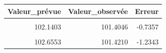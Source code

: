 \centering
\centering
\begin{tabular}[t]{rrr}
\toprule
Valeur\_prévue & Valeur\_observée & Erreur\\
\midrule
\cellcolor{gray!10}{102.1631} & \cellcolor{gray!10}{101.3877} & \cellcolor{gray!10}{-0.7754}\\
102.1403 & 101.4046 & -0.7357\\
\cellcolor{gray!10}{102.0547} & \cellcolor{gray!10}{101.4046} & \cellcolor{gray!10}{-0.6501}\\
102.6553 & 101.4210 & -1.2343\\
\bottomrule
\end{tabular}

